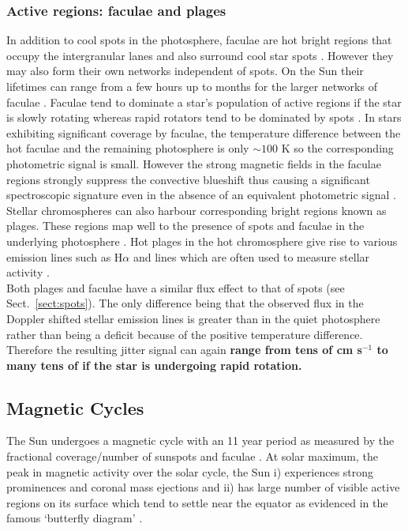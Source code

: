 \subsubsection{Active regions: faculae and plages} \label{sect:plages}
In addition to cool spots in the photosphere, 
faculae are hot bright regions that occupy the intergranular lanes and also surround  
cool star spots \parencite{thomas08}. However they may also form their own networks 
independent of spots. On the Sun their lifetimes can range from a few hours up to months 
for the larger networks of faculae \parencite{hirayama78}. Faculae tend to dominate 
a star's population of active regions if the star is slowly rotating whereas rapid rotators 
tend to be dominated by spots \parencite{lockwood07}. In stars exhibiting significant 
coverage by faculae, the temperature difference 
between the hot faculae and the remaining photosphere is only $\sim 100$ K \parencite{thomas08} 
so the corresponding photometric signal is small. However the strong magnetic fields in the 
faculae regions strongly suppress the convective blueshift thus causing a significant 
spectroscopic signature even in the absence of an equivalent photometric signal 
\parencite{meunier10}. \\

Stellar chromospheres can also harbour corresponding bright regions 
known as plages. These regions 
map well to the presence of spots and faculae in the underlying photosphere 
\parencite{hall08}. Hot plages in the hot chromosphere give rise to various emission 
lines such as H$\alpha$ and \caii{} lines which are often used 
to measure stellar activity \parencite{cincunegui07}. \\

Both plages and faculae have a similar flux effect to that of spots (see Sect.~\ref{sect:spots}). 
The only difference being that the observed flux in the Doppler shifted stellar emission lines is 
greater than in the quiet photosphere rather than being a deficit because of the positive temperature 
difference. Therefore the resulting jitter signal can again \textbf{range from tens of cm s$^{-1}$ 
to many tens of \mps{} if the star is undergoing rapid rotation.}

\subsection{Magnetic Cycles}
The Sun undergoes a magnetic cycle with an 11 year period as measured by the fractional 
coverage/number of sunspots and faculae \parencite{hathaway10}. At solar maximum, the 
peak in magnetic activity over the solar cycle, the Sun i) experiences strong prominences 
and coronal mass ejections and ii) has large number of visible active regions on its surface  
which tend to settle near the equator as evidenced in the famous `butterfly diagram' 
\parencite[see Fig.~\ref{fig:butterfly};][]{maunder04}.  \\

